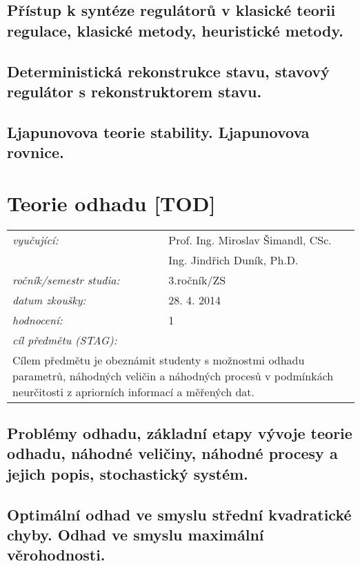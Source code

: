 \subsection{Přístup k syntéze regulátorů v klasické teorii regulace, klasické metody, heuristické metody.}

\subsection{Deterministická rekonstrukce stavu, stavový regulátor s rekonstruktorem stavu.}

\subsection{Ljapunovova teorie stability. Ljapunovova rovnice.}

\section{Teorie odhadu [TOD]}

\begin{table}[H]
\centering
\begin{tabular}{p{4cm} p{12cm}}
\textit{vyučující:}             & Prof. Ing. Miroslav Šimandl, CSc. \\
								 & Ing. Jindřich Duník, Ph.D. \\
\textit{ročník/semestr studia:} & 3.ročník/ZS \\
\textit{datum zkoušky:}         & 28. 4. 2014 \\
\textit{hodnocení:}             & 1 \\
\textit{cíl předmětu (STAG):}   & \\
\multicolumn{2}{p{16cm}}{Cílem předmětu je obeznámit studenty s možnostmi odhadu parametrů, náhodných veličin a náhodných procesů v podmínkách neurčitosti z apriorních informací a měřených dat.}
\end{tabular}
\end{table}

\subsection{Problémy odhadu, základní etapy vývoje teorie odhadu, náhodné veličiny, náhodné procesy a jejich popis, stochastický systém.}

\subsection{Optimální odhad ve smyslu střední kvadratické chyby. Odhad ve smyslu maximální věrohodnosti.}

